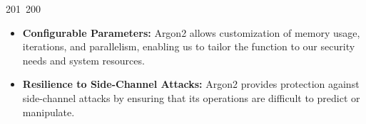 201~200~\documentclass{article}
\begin{document}
\begin{itemize}
	                                                                                                                                                                                                                                                                                                	                                                                                                                                        	    	                                                                                                	                                                                                                                                                                                                                                                                                                                                	                                                                        	                                                                        	                                                                            \item \textbf{Configurable Parameters:} Argon2 allows customization of memory usage, iterations, and parallelism, enabling us to tailor the function to our security needs and system resources.
	                                                                                                                                                                                                                                                                                                	                                                                                                                                        	    	                                                                                                	                                                                                                                                                                                                                                                                                                                                	                                                                        	                                                                        	                                                                                \item \textbf{Resilience to Side-Channel Attacks:} Argon2 provides protection against side-channel attacks by ensuring that its operations are difficult to predict or manipulate.

\end{itemize}
\end{document}
